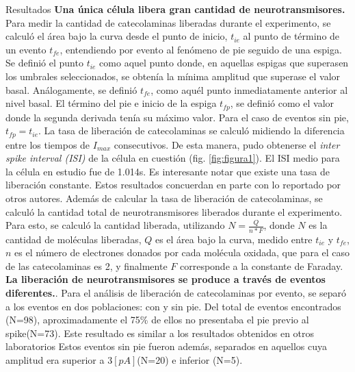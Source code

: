 \documentclass[twocolumn]{article}
\makeatletter
\def\section{\@startsection {section}{1}{\z@}{24pt plus 2pt minus 2pt}
{12pt plus 2pt minus 2pt}{\large\bf}}
\makeatother
\begin{document}
\section{Resultados}
{\bf Una única célula libera gran cantidad de neurotransmisores.} Para medir la cantidad de catecolaminas liberadas durante el experimento, se calculó el área bajo la curva desde el punto de inicio, $t_{ie}$ al punto de término de un evento $t_{fe}$, entendiendo por evento al fenómeno de pie seguido de una espiga.  Se definió el punto $t_{ie}$ como aquel punto donde, en aquellas espigas que superasen los umbrales seleccionados, se obtenía la mínima amplitud que superase el valor basal.  Análogamente, se definió $t_{fe}$, como aquél punto inmediatamente anterior al nivel basal. El término del pie e inicio de la espiga $t_{fp}$, se definió como el valor donde la segunda derivada tenía su máximo valor\citep{evanko2005primer}.  Para el caso de eventos sin pie, $t_{fp} = t_{ie}$.
La tasa de liberación de catecolaminas se calculó midiendo la diferencia entre los tiempos de $I_{max}$ consecutivos.  De esta manera, pudo obtenerse el \textit{inter spike interval (ISI)} de la célula en cuestión (fig. \ref{fig:figura1}). El ISI medio para la célula en estudio fue de 1.014s.  
Es interesante notar que existe una tasa de liberación constante. Estos resultados concuerdan en parte con lo reportado por otros autores\citep{jarukanont2015vesicle}.  
Además de calcular la tasa de liberación de catecolaminas, se calculó la cantidad total de neurotransmisores liberados durante el experimento.  Para esto, se calculó la cantidad liberada, utilizando $N = \frac{Q}{n*F}$, donde $N$ es la cantidad de moléculas liberadas, $Q$ es el área bajo la curva, medido entre $t_{ie}$ y $t_{fe}$, $n$ es el número de electrones donados por cada molécula oxidada, que para el caso de las catecolaminas es 2, y finalmente $F$ corresponde a la constante de Faraday\citep{evanko2005primer}.\\

{\bf La liberación de neurotransmisores se produce a través de eventos diferentes.}. Para el análisis de liberación de catecolaminas por evento, se separó a los eventos en dos poblaciones: con y sin pie.  Del total de eventos encontrados (N=98), aproximadamente el 75\% de ellos no presentaba el pie previo al spike(N=73). Este resultado es similar a los resultados obtenidos en otros laboratorios \cite{amatore2005correlation,amatore2009quantitative}  Estos eventos sin pie fueron además, separados en aquellos cuya amplitud era superior a $3[pA]$(N=20) e inferior (N=5).
\end{document}
